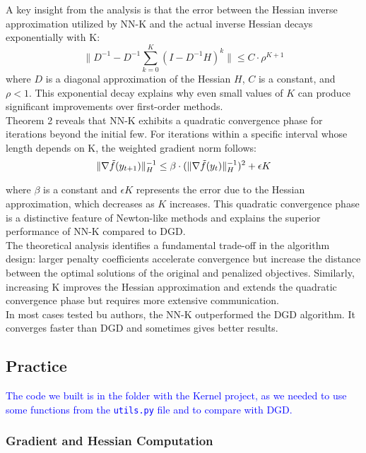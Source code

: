 \documentclass[10pt,english]{article}
\begin{document}
A key insight from the analysis is that the error between the Hessian inverse approximation utilized by NN-K and the actual inverse Hessian decays exponentially with K:
\begin{equation}
\|D^{-1} - D^{-1}\sum_{k=0}^{K} (I-D^{-1}H)^k\| \leq C\cdot\rho^{K+1}
\end{equation}
where $D$ is a diagonal approximation of the Hessian $H$, $C$ is a constant, and $\rho < 1$. This exponential decay explains why even small values of $K$ can produce significant improvements over first-order methods.\\

Theorem 2 reveals that NN-K exhibits a quadratic convergence phase for iterations beyond the initial few. For iterations within a specific interval whose length depends on K, the weighted gradient norm follows:
\begin{equation}
    \|\nabla \Tilde{f}(y_{t+1})\|_H^{-1} \leq \beta \cdot(\|\nabla \Tilde{f}(y_{t})\|_H^{-1})^2 + \epsilon K
\end{equation}

where $\beta$ is a constant and $\epsilon K$ represents the error due to the Hessian approximation, which decreases as $K$ increases. This quadratic convergence phase is a distinctive feature of Newton-like methods and explains the superior performance of NN-K compared to DGD.\\

The theoretical analysis identifies a fundamental trade-off in the algorithm design: larger penalty coefficients accelerate convergence but increase the distance between the optimal solutions of the original and penalized objectives. Similarly, increasing K improves the Hessian approximation and extends the quadratic convergence phase but requires more extensive communication.\\


In most cases tested bu authors, the NN-K outperformed the DGD algorithm. It converges faster than DGD and sometimes gives better results.
\newpage
\subsection{Practice}
\textcolor{blue}{The code we built is in the folder with the Kernel project, as we needed to use some functions from the \texttt{utils.py} file and to compare with DGD.}
\subsubsection{Gradient and Hessian Computation}
\end{document}
